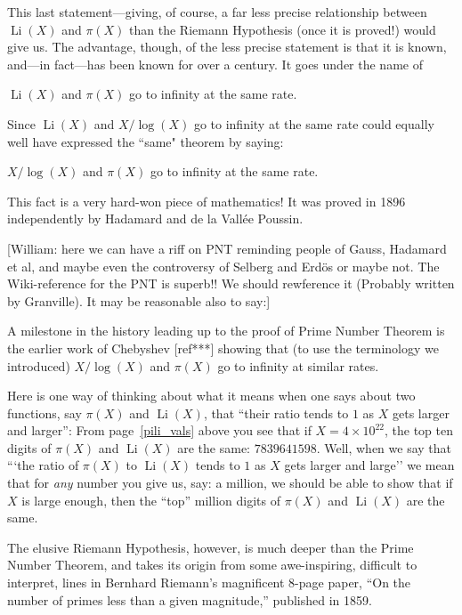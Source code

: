 \documentclass[11pt]{article}
\DeclareMathOperator{\Li}{Li}
\theoremstyle{plain}
\theoremstyle{definition}
\numberwithin{equation}{section}
\numberwithin{figure}{section}
\numberwithin{table}{section}
\begin{document}
This last statement---giving, of course, a far less precise
relationship between $\Li(X)$ and $\pi(X)$ than the Riemann Hypothesis
(once it is proved!) would give us.  The advantage, though, of the
less precise statement is that it is known, and---in fact---has been
known for over a century. It goes under the name of
  
\vskip10pt
  $\Li(X)$ and $\pi(X)$ go to infinity at the same rate.
   \vskip10pt

   Since $\Li(X)$ and $X/\log(X)$ go to infinity at the same rate could
   equally well have expressed the ``same" theorem by saying:

  \vskip10pt
   $X/\log(X)$ and $\pi(X)$ go to infinity at the same rate.
   \vskip10pt
    
   This fact is a very hard-won piece of mathematics!  It was proved
   in 1896 independently by Hadamard and de la Vall\'{e}e Poussin.

   [William: here we can have a riff on PNT reminding people of Gauss,
   Hadamard et al, and maybe even the controversy of Selberg and
   Erd{\"o}s or maybe not. The Wiki-reference for the PNT is superb!!
   We should rewference it (Probably written by Granville).  It may be
   reasonable also to say:]

        \vskip10pt
        
        A milestone in the history leading up to the proof of Prime
        Number Theorem is the earlier work of Chebyshev [ref***]
        showing that (to use the terminology we introduced)
        $X/\log(X)$ and $\pi(X)$ go to infinity at similar rates.
        \vskip15pt

Here is one way of thinking about what it means when one says about
two functions, say $\pi(X)$ and $\Li(X)$, that ``their ratio tends to
$1$ as $X$ gets larger and larger'': From page~\ref{pili_vals} above
you see that if $X = 4\times 10^{22}$, the top ten digits of $\pi (X)$
and $\Li(X)$ are the same: $7839641598$.  Well, when we say that ```the
ratio of $\pi(X)$ to $\Li(X)$ tends to $1$ as $X$ gets larger and
large'' we mean that for {\em any} number you give us, say: a million,
we should be able to show that if $X$ is large enough, then the
``top'' million digits of $\pi (X)$ and $\Li(X)$ are the same.

The elusive Riemann Hypothesis, however, is much deeper than the Prime
Number Theorem, and takes its origin from some awe-inspiring,
difficult to interpret, lines in Bernhard Riemann's magnificent 8-page
paper, ``On the number of primes less than a given magnitude,''
published in 1859. 
 
\end{document}
